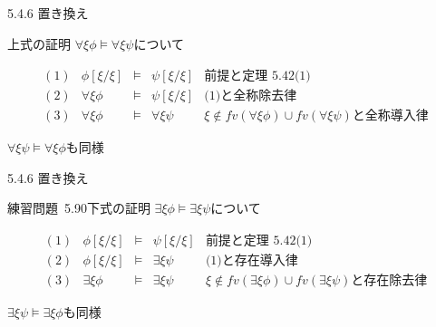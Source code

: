 \documentclass[dvipdfmx,11pt]{beamer}
\begin{document}
\begin{frame}{5.4.6 置き換え}
  \begin{block}{上式の証明}
    \(\forall\xi\phi\vDash\forall\xi\psi\)について

    \[
    \begin{array}{rrcll}
      (1) & \phi[\xi/\xi] & \vDash & \psi[\xi/\xi] & \textit{前提と定理~5.42(1)} \\
      (2) & \forall\xi\phi & \vDash & \psi[\xi/\xi] & \textit{(1)と全称除去律} \\
      (3) & \forall\xi\phi & \vDash & \forall\xi\psi & \xi\not\in\textit{fv}(\forall\xi\phi)\cup\textit{fv}(\forall\xi\psi)\textit{と全称導入律}
    \end{array}
    \]

    \(\forall\xi\psi\vDash\forall\xi\phi\)も同様
  \end{block}
\end{frame}

\begin{frame}{5.4.6 置き換え}
  \begin{block}{練習問題~5.90下式の証明}
    \(\exists\xi\phi\vDash\exists\xi\psi\)について

    \[
    \begin{array}{rrcll}
      (1) & \phi[\xi/\xi] & \vDash & \psi[\xi/\xi] & \textit{前提と定理~5.42(1)} \\
      (2) & \phi[\xi/\xi] & \vDash & \exists\xi\psi & \textit{(1)と存在導入律} \\
      (3) & \exists\xi\phi & \vDash & \exists\xi\psi & \xi\not\in\textit{fv}(\exists\xi\phi)\cup\textit{fv}(\exists\xi\psi)\textit{と存在除去律}
    \end{array}
    \]

    \(\exists\xi\psi\vDash\exists\xi\phi\)も同様
  \end{block}
\end{frame}
\end{document}

